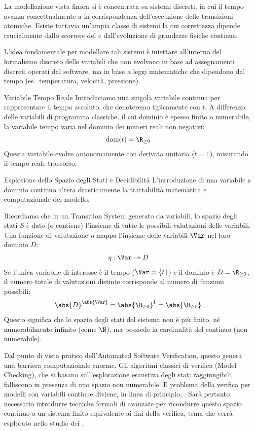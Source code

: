 La modellazione vista finora si è concentrata su sistemi discreti, in cui il tempo avanza concettualmente a  in corrispondenza dell'esecuzione delle transizioni atomiche. Esiste tuttavia un'ampia classe di sistemi la cui correttezza dipende crucialmente dallo scorrere del  e dall'evoluzione di grandezze fisiche continue.

L'idea fondamentale per modellare tali sistemi è iniettare all'interno del formalismo discreto delle variabili che non evolvono in base ad assegnamenti discreti operati dal software, ma in base a leggi matematiche che dipendono dal tempo (es.\ temperatura, velocità, pressione).

\begin{definition}{Variabile Tempo Reale}
  Introduciamo una singola variabile continua per rappresentare il tempo assoluto, che denoteremo tipicamente con \(t\). A differenza delle variabili di programma classiche, il cui dominio è spesso finito o numerabile, la variabile tempo varia nel dominio dei numeri reali non negativi:
  \[ \text{dom}(t) = \R_{\ge 0} \]
  Questa variabile evolve autonomamente con derivata unitaria (\(\dot{t} = 1\)), misurando il tempo reale trascorso.
\end{definition}

\begin{observation}{Esplosione dello Spazio degli Stati e Decidibilità}
  L'introduzione di una variabile a dominio continuo altera drasticamente la trattabilità matematica e computazionale del modello.

  Ricordiamo che in un Transition System generato da variabili, lo spazio degli stati \(S\) è dato (o contiene) l'insieme di tutte le possibili valutazioni delle variabili. Una funzione di valutazione \(\eta\) mappa l'insieme delle variabili \(\Var\) nel loro dominio \(D\):
  \[ \eta: \Var \to D \]
  Se l'unica variabile di interesse è il tempo (\(\Var = \{t\}\)) e il dominio è \(D = \R_{\ge 0}\), il numero totale di valutazioni distinte corrisponde al numero di funzioni possibili:
  \[ \abs{D}^{\abs{\Var}} = \abs{\R_{\ge 0}}^1 = \abs{\R_{\ge 0}} \]
  Questo significa che lo spazio degli stati del sistema non è più finito, né numerabilmente infinito (come \(\N\)), ma possiede la cardinalità del continuo (non numerabile).

  Dal punto di vista pratico dell'Automated Software Verification, questo genera una barriera computazionale enorme. Gli algoritmi classici di verifica (Model Checking), che si basano sull'esplorazione esaustiva degli stati raggiungibili, falliscono in presenza di uno spazio non numerabile. Il problema della verifica per modelli con variabili continue diviene, in linea di principio, . Sarà pertanto necessario introdurre tecniche formali di  avanzate per ricondurre questo spazio continuo a un sistema finito equivalente ai fini della verifica, tema che verrà esplorato nello studio dei .
\end{observation}